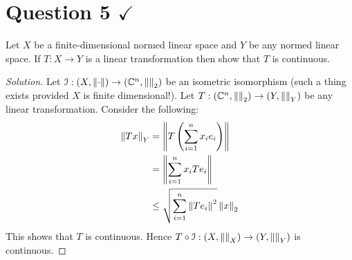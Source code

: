 \section{Question 5 \texorpdfstring{$\checkmark$}{}} 
\horz
Let $X$ be a finite-dimensional normed linear space and $Y$ be any normed linear space. If $T : X \rightarrow Y$ is a linear transformation then show that $T$ is continuous.
\horz

\begin{proof}[Solution]
    Let ${\cal I} : \left( X, \left\lVert \cdot \right\rVert \right) \to \left( \mathbb C^{n}, \left\lVert  \right\rVert_{2} \right)$ be an isometric isomorphism (such a thing exists provided $X$ is finite dimensional!). Let $T: \left( \mathbb C ^{n} , \left\lVert  \right\rVert_{2} \right) \to \left( Y, \left\lVert  \right\rVert_{Y} \right)$ be any linear transformation. Consider the following:
    \begin{align*}
	\left\lVert Tx \right\rVert_{Y} &= \left\lVert T \left( \sum_{i=1}^{n} x_{i} e_{i} \right)  \right\rVert  \\
	&= \left\lVert \sum_{i=1}^{n} x_{i} Te_{i} \right\rVert \\
	&\le \sqrt{\sum_{i=1}^{n} \left\lVert Te_{i} \right\rVert^{2}} \left\lVert x \right\rVert_{2}
    \end{align*}
    This shows that $T$ is continuous. Hence $T \circ {\cal I} : \left( X, \left\lVert  \right\rVert_{X} \right) \to  \left( Y, \left\lVert  \right\rVert_{Y} \right)$ is continuous.
\end{proof}
